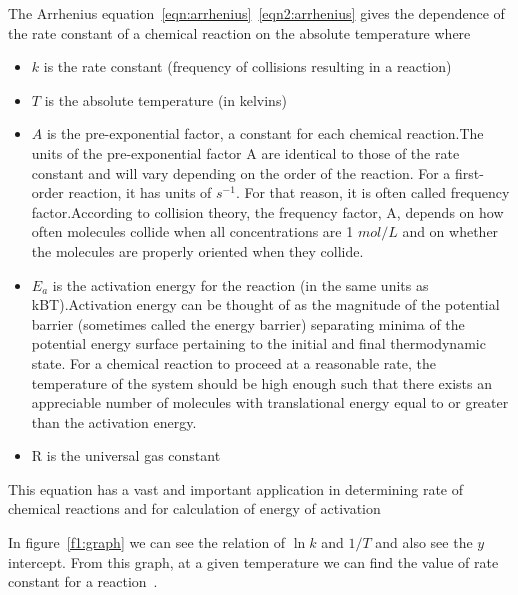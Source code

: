 \documentclass[a4paper, 12pt]{article}
\begin{document}
The Arrhenius equation~\ref{eqn:arrhenius}~\ref{eqn2:arrhenius} gives the dependence of the rate constant of a chemical reaction on the absolute temperature where 
\begin{itemize}
	\item $k$ is the rate constant (frequency of collisions resulting in a reaction)
	\item $T$ is the absolute temperature (in kelvins)
	\item $A$ is the pre-exponential factor, a constant for each chemical reaction.The units of the pre-exponential factor A are identical to those of the rate constant and will vary depending on the order of the reaction. For a first-order reaction, it has units of $s^{-1}$. For that reason, it is often called frequency factor.According to collision theory, the frequency factor, A, depends on how often molecules collide when all concentrations are 1 $mol/L$ and on whether the molecules are properly oriented when they collide.
	\item $E_a$ is the activation energy for the reaction (in the same units as kBT).Activation energy can be thought of as the magnitude of the potential barrier (sometimes called the energy barrier) separating minima of the potential energy surface pertaining to the initial and final thermodynamic state. For a chemical reaction to proceed at a reasonable rate, the temperature of the system should be high enough such that there exists an appreciable number of molecules with translational energy equal to or greater than the activation energy.
	\item R is the universal gas constant

\end{itemize}

This equation has a vast and important application in determining rate of chemical reactions and for calculation of energy of activation~\cite{bohn}

In figure~\ref{f1:graph} we can see the relation of $\ln{k}$ and $1/T$ and also see the $y$ intercept. From this graph, at a given temperature we can find the value of rate constant for a reaction~\cite{fabrikant}.






\end{document}
